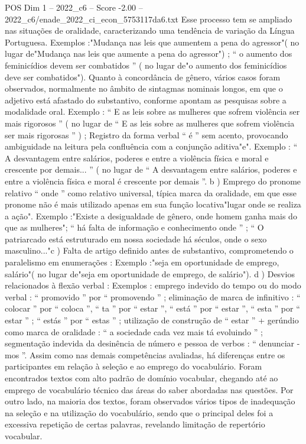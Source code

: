 \begin{textsample}{POS Dim 1 – 2022\_c6 – Score -2.00 – 2022\_c6/enade\_2022\_ci\_econ\_5753117da6.txt}
Esse processo tem se ampliado nas situações de oralidade, caracterizando uma tendência de variação da Língua Portuguesa.
Exemplos :"Mudança nas leis que aumentem a pena do agressor"( no lugar de"Mudança nas leis que aumente a pena do agressor") ; “ o aumento dos feminicídios devem ser combatidos ” ( no lugar de"o aumento dos feminicídios deve ser combatidos").
Quanto à concordância de gênero, vários casos foram observados, normalmente no âmbito de sintagmas nominais longos, em que o adjetivo está afastado do substantivo, conforme apontam as pesquisas sobre a modalidade oral.
Exemplo : “ E as leis sobre as mulheres que sofrem violência ser mais rigorosos ” ( no lugar de “ E as leis sobre as mulheres que sofrem violência ser mais rigorosas ” ) ; Registro da forma verbal “ é ” sem acento, provocando ambiguidade na leitura pela confluência com a conjunção aditiva"e".
Exemplo : “ A desvantagem entre salários, poderes e entre a violência física e moral e crescente por demais... ” ( no lugar de “ A desvantagem entre salários, poderes e entre a violência física e moral é crescente por demais ”. b ) Emprego do pronome relativo “ onde ” como relativo universal, típica marca da oralidade, em que esse pronome não é mais utilizado apenas em sua função locativa"lugar onde se realiza a ação".
Exemplo :"Existe a desigualdade de gênero, onde homem ganha mais do que as mulheres"; “ há falta de informação e conhecimento onde ” ; “ O patriarcado está estruturado em nossa sociedade há séculos, onde o sexo masculino..."c ) Falta de artigo definido antes de substantivo, comprometendo o paralelismo em enumerações : Exemplo :"seja em oportunidade de emprego, salário"( no lugar de"seja em oportunidade de emprego, de salário"). d ) Desvios relacionados à flexão verbal : Exemplos : emprego indevido do tempo ou do modo verbal : “ promovido ” por “ promovendo ” ; eliminação de marca de infinitivo : “ colocar ” por “ coloca ”, “ ta ” por “ estar ”, “ está ” por “ estar ”, “ esta ” por “ estar ” ; “ estás ” por “ estas ” ; utilização de construção de “ estar ” + gerúndio como marca de oralidade : “ a sociedade cada vez mais tá evoluindo ” ; segmentação indevida da desinência de número e pessoa de verbos : “ denunciar -mos ”.
Assim como nas demais competências avaliadas, há diferenças entre os participantes em relação à seleção e ao emprego do vocabulário.
Foram encontrados textos com alto padrão de domínio vocabular, chegando até ao emprego de vocabulário técnico das áreas do saber abordadas nas questões.
Por outro lado, na maioria dos textos, foram observados vários tipos de inadequação na seleção e na utilização do vocabulário, sendo que o principal deles foi a excessiva repetição de certas palavras, revelando limitação de repertório vocabular.

\end{textsample}
